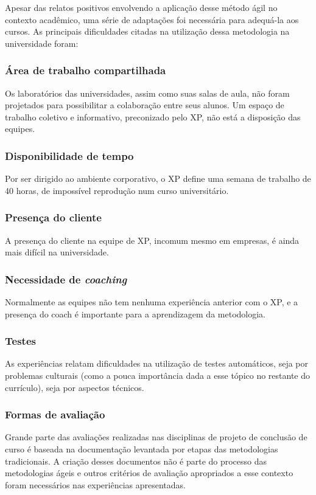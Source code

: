 \documentclass[a4paper,12pt,font=plain,header=plain]{abnt}
\begin{document}
      Apesar das relatos positivos envolvendo a aplicação desse método ágil no contexto acadêmico, uma série de adaptações foi necessária para adequá-la aos cursos. As principais dificuldades citadas na utilização dessa metodologia na universidade foram:

      \subsubsection{Área de trabalho compartilhada}
        Os laboratórios das universidades, assim como suas salas de aula, não foram projetados para possibilitar a colaboração entre seus alunos. Um espaço de trabalho coletivo e informativo, preconizado pelo XP, não está a disposição das equipes.

      \subsubsection{Disponibilidade de tempo}
        Por ser dirigido ao ambiente corporativo, o XP define uma semana de trabalho de 40 horas, de impossível reprodução num curso universitário.

      \subsubsection{Presença do cliente}
        A presença do cliente na equipe de XP, incomum mesmo em empresas, é ainda mais difícil na universidade.

      \subsubsection{Necessidade de \textit{coaching}}
        Normalmente as equipes não tem nenhuma experiência anterior com o XP, e a presença do coach é importante para a aprendizagem da metodologia.

      \subsubsection{Testes}
        As experiências relatam dificuldades na utilização de testes automáticos, seja por problemas culturais (como a pouca importância dada a esse tópico no restante do currículo), seja por aspectos técnicos.

      \subsubsection{Formas de avaliação}
        Grande parte das avaliações realizadas nas disciplinas de projeto de conclusão de curso é baseada na documentação levantada por etapas das metodologias tradicionais. A criação desses documentos não é parte do processo das metodologias ágeis e outros critérios de avaliação apropriados a esse contexto foram necessários nas experiências apresentadas.
\end{document}
